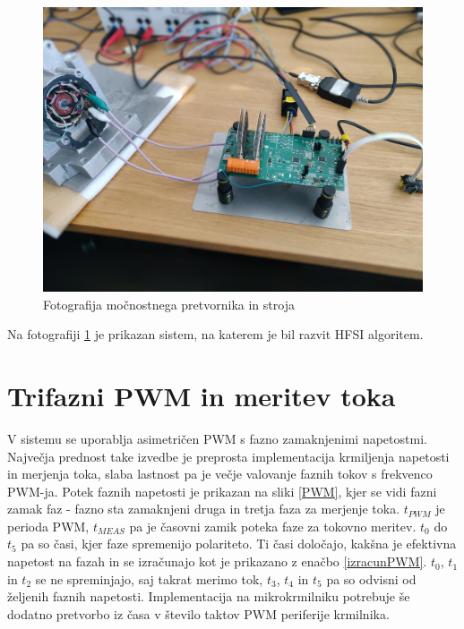 \documentclass[a4paper,twoside,openright,12pt,slovene]{book}
\begin{document}
\begin{figure}[!htbp]
    \centering
    \includegraphics[width=0.75\columnwidth]{Slike/EksperimentiSlika.jpg}
    \caption{\label{experimentiSlika} Fotografija močnostnega pretvornika in stroja}
\end{figure}

Na fotografiji \ref{experimentiSlika} je prikazan sistem, na katerem je bil razvit HFSI algoritem. 

\section{Trifazni PWM in meritev toka}

V sistemu se uporablja asimetričen PWM s fazno zamaknjenimi napetostmi. Največja prednost take izvedbe je preprosta implementacija krmiljenja napetosti in merjenja toka, slaba lastnost pa je večje valovanje
faznih tokov s frekvenco PWM-ja. Potek faznih napetosti je prikazan na sliki \ref{PWM}, kjer se vidi fazni zamak faz - fazno sta zamaknjeni druga in tretja faza za merjenje toka. $t_{PWM}$ je perioda PWM, $t_{MEAS}$
pa je časovni zamik poteka faze za tokovno meritev. $t_0$ do $t_5$ pa so časi, kjer faze spremenijo polariteto. Ti časi določajo, kakšna je efektivna napetost na fazah in se izračunajo kot je
prikazano z enačbo \ref{izracunPWM}. $t_0$, $t_1$ in $t_2$ se ne spreminjajo, saj takrat merimo tok, $t_3$, $t_4$ in $t_5$ pa so odvisni od željenih faznih napetosti. Implementacija na mikrokrmilniku
potrebuje še dodatno pretvorbo iz časa v število taktov PWM periferije krmilnika.
\end{document}
